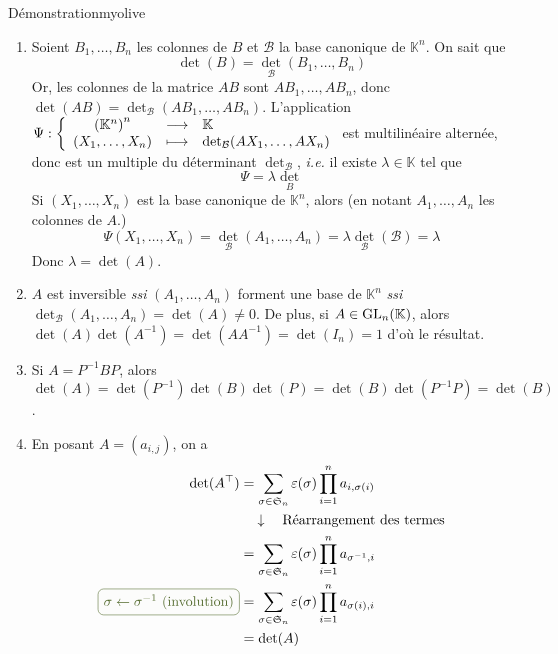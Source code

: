     \begin{demo}{Démonstration}{myolive}
        \begin{enumerate}
            \item Soient $B_1,\ldots,B_n$ les colonnes de $B$ et $\mathcal{B}$ la base canonique de $\mathbb{K}^n$. On sait que 
        \[ \det(B) = \det_{\mathcal{B}}(B_1,\ldots,B_n) \]   
        Or, les colonnes de la matrice $AB$ sont $A B_1,\ldots, A B_n$, donc $\det(AB) = \det_{\mathcal{B}}(AB_1,\ldots,AB_n)$. L’application $\fonction{\Psi}{\left(\mathbb{K}^n\right)^n}{\mathbb{K}}{(X_1,\ldots,X_n)}{\det_{\mathcal{B}}(AX_1,\ldots,AX_n)}$ est multilinéaire alternée, donc est un multiple du déterminant $\det_{\mathcal{B}}$, \textit{i.e.} il existe $\lambda \in \mathbb{K}$ tel que 
        \[ \Psi = \lambda \det_{B} \]   
        Si $(X_1,\ldots,X_n)$ est la base canonique de $\mathbb{K}^n$, alors (en notant $A_1,\ldots,A_n$ les colonnes de $A$.)
        \[ \Psi(X_1,\ldots,X_n) = \det_{\mathcal{B}}(A_1, \ldots, A_n) = \lambda \det_{\mathcal{B}}(\mathcal{B}) = \lambda \]
        Donc $\lambda = \det(A)$. 
            \item $A$ est inversible \textit{ssi} $(A_1,\ldots,A_n)$ forment une base de $\mathbb{K}^n$ \textit{ssi} $\det_{\mathcal{B}}(A_1,\ldots,A_n) = \det(A) \neq 0$. De plus, si $A \in \operatorname{GL}_n(\mathbb{K})$, alors $\det(A)\det(A^{-1}) = \det(AA^{-1}) = \det(I_n) = 1$ d’où le résultat.
            \item Si $A = P^{-1} B P$, alors $\det(A) = \det(P^{-1}) \det(B) \det(P) = \det(B) \det(P^{-1} P) = \det(B)$.
            \item En posant $A = \left(a_{i,j}\right)$, on a 
            \begin{align*}
                \det(A^{\top}) 
                &= \sum_{\sigma \in \mathfrak{S}_n} \varepsilon(\sigma) \prod_{i = 1}^n a_{i, \sigma(i)} \\
                &\quad \downarrow \quad \text{Réarrangement des termes} \\
                &= \sum_{\sigma \in \mathfrak{S}_n} \varepsilon(\sigma) \prod_{i = 1}^n a_{\sigma^{-1}, i} \\
                \lilbox{myolive}{$\sigma \leftarrow \sigma^{-1}$ (involution)} &= \sum_{\sigma \in \mathfrak{S}_n} \varepsilon(\sigma) \prod_{i = 1}^n a_{\sigma(i), i} \\
                &= \det(A)
            \end{align*}
        \end{enumerate}
    \end{demo}

